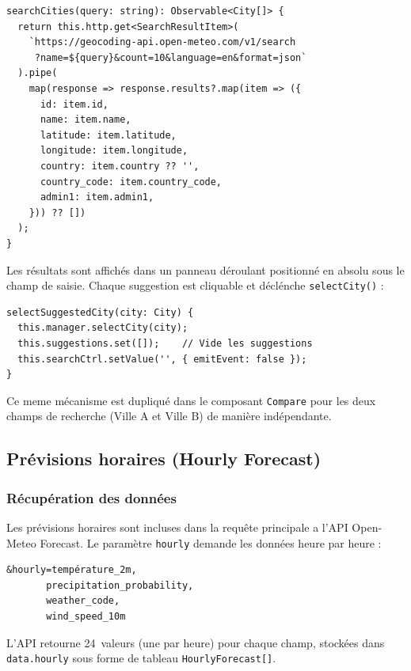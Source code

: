 \documentclass[12pt,a4paper]{article}
\begin{document}
\begin{lstlisting}[style=angular, caption={Requete de géocodage}]
searchCities(query: string): Observable<City[]> {
  return this.http.get<SearchResultItem>(
    `https://geocoding-api.open-meteo.com/v1/search
     ?name=${query}&count=10&language=en&format=json`
  ).pipe(
    map(response => response.results?.map(item => ({
      id: item.id,
      name: item.name,
      latitude: item.latitude,
      longitude: item.longitude,
      country: item.country ?? '',
      country_code: item.country_code,
      admin1: item.admin1,
    })) ?? [])
  );
}
\end{lstlisting}

Les résultats sont affichés dans un panneau déroulant positionné en absolu sous le champ de saisie. Chaque suggestion est cliquable et déclénche \texttt{selectCity()} :

\begin{lstlisting}[style=angular, caption={Selection d'une ville suggeree}]
selectSuggestedCity(city: City) {
  this.manager.selectCity(city);
  this.suggestions.set([]);    // Vide les suggestions
  this.searchCtrl.setValue('', { emitEvent: false });
}
\end{lstlisting}

Ce meme mécanisme est dupliqué dans le composant \texttt{Compare} pour les deux champs de recherche (Ville A et Ville B) de manière indépendante.

\newpage
\subsection{Prévisions horaires (Hourly Forecast)}

\subsubsection{Récupération des données}

Les prévisions horaires sont incluses dans la requête principale a l'API Open-Meteo Forecast. Le paramètre \texttt{hourly} demande les données heure par heure :

\begin{lstlisting}[style=angular, caption={Parametres de la requete horaire}]
&hourly=température_2m,
       precipitation_probability,
       weather_code,
       wind_speed_10m
\end{lstlisting}

L'API retourne 24~valeurs (une par heure) pour chaque champ, stockées dans \texttt{data.hourly} sous forme de tableau \texttt{HourlyForecast[]}.
\end{document}
